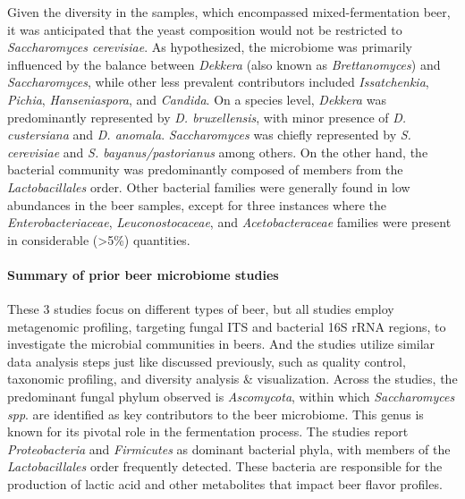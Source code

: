                 Given the diversity in the samples, which encompassed mixed-fermentation beer, it was anticipated that the yeast composition would not be restricted to \textit{Saccharomyces cerevisiae}. As hypothesized, the microbiome was primarily influenced by the balance between \textit{Dekkera} (also known as \textit{Brettanomyces}) and \textit{Saccharomyces}, while other less prevalent contributors included \textit{Issatchenkia}, \textit{Pichia}, \textit{Hanseniaspora}, and \textit{Candida}. On a species level, \textit{Dekkera} was predominantly represented by \textit{D. bruxellensis}, with minor presence of \textit{D. custersiana} and \textit{D. anomala}. \textit{Saccharomyces} was chiefly represented by \textit{S. cerevisiae} and \textit{S. bayanus/pastorianus} among others. On the other hand, the bacterial community was predominantly composed of members from the \textit{Lactobacillales} order. Other bacterial families were generally found in low abundances in the beer samples, except for three instances where the \textit{Enterobacteriaceae}, \textit{Leuconostocaceae}, and \textit{Acetobacteraceae} families were present in considerable (>5\%) quantities.

            \paragraph*{Summary of prior beer microbiome studies}
                These 3 studies focus on different types of beer, but all studies employ metagenomic profiling, targeting fungal ITS and bacterial 16S rRNA regions, to investigate the microbial communities in beers. And the studies utilize similar data analysis steps just like discussed previously, such as quality control, taxonomic profiling, and diversity analysis \& visualization. Across the studies, the predominant fungal phylum observed is \textit{Ascomycota}, within which \textit{Saccharomyces spp}. are identified as key contributors to the beer microbiome. This genus is known for its pivotal role in the fermentation process. The studies report \textit{Proteobacteria} and \textit{Firmicutes} as dominant bacterial phyla, with members of the \textit{Lactobacillales} order frequently detected. These bacteria are responsible for the production of lactic acid and other metabolites that impact beer flavor profiles.
                